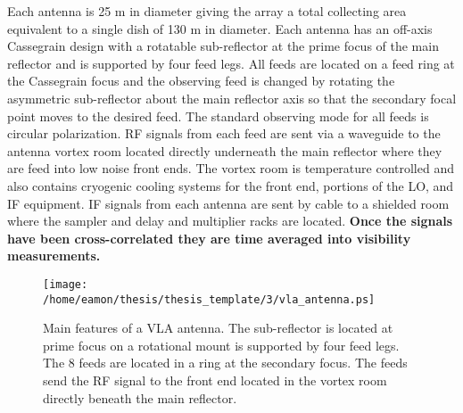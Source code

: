 Each antenna is 25 m in diameter giving the array a total collecting area equivalent to a single dish of 130 m in diameter. Each antenna has an off-axis Cassegrain design with a rotatable sub-reflector at the prime focus of the main reflector and is supported by four feed legs. All feeds are located on a feed ring at the Cassegrain focus and the observing feed is changed by rotating the asymmetric sub-reflector about the main reflector axis so that the secondary focal point moves to the desired feed. The standard observing mode for all feeds is circular polarization. RF signals from each feed  are sent via a waveguide to the antenna vortex room located directly underneath the main reflector where they are feed into low noise front ends. The vortex room is temperature controlled and also contains cryogenic cooling systems for the front end, portions of the LO, and IF equipment. IF signals from each antenna are sent by cable to a shielded room where the sampler and delay and multiplier racks are located. \textbf{Once the signals have been cross-correlated they are time averaged into visibility measurements.}

\begin{figure}[hbt!]
\centering 
          \texttt{[image: /home/eamon/thesis/thesis\_template/3/vla\_antenna.ps]}
\caption[Main features of a VLA antenna.]{Main features of a VLA antenna. The sub-reflector is located at prime focus on a rotational mount is supported by four feed legs. The 8 feeds are located in a ring at the secondary focus. The feeds send the RF signal to the front end located in the vortex room directly beneath the main reflector.}
\label{fig3.1}
\end{figure}

